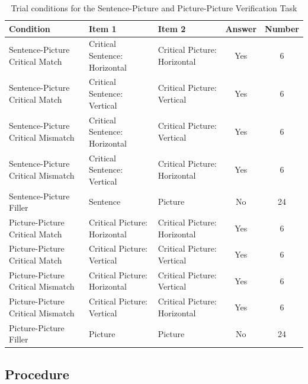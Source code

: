 \documentclass[
  man,mask,floatsintext]{apa7}
\begin{document}
\begin{table}[tbp]

\begin{center}
\begin{threeparttable}

\caption{\label{tab:stim-table}Trial conditions for the Sentence-Picture and Picture-Picture Verification Task}

\scriptsize{

\begin{tabular}{lllcc}
\toprule
Condition & Item 1 & Item 2 & Answer & Number\\
\midrule
Sentence-Picture
Critical
Match & Critical Sentence:
Horizontal & Critical Picture:
Horizontal & Yes & 6\\
Sentence-Picture
Critical
Match & Critical Sentence:
Vertical & Critical Picture:
Vertical & Yes & 6\\
Sentence-Picture
Critical
Mismatch & Critical Sentence:
Horizontal & Critical Picture:
Vertical & Yes & 6\\
Sentence-Picture
Critical
Mismatch & Critical Sentence:
Vertical & Critical Picture:
Horizontal & Yes & 6\\
Sentence-Picture
Filler & Sentence & Picture & No & 24\\
Picture-Picture
Critical
Match & Critical Picture:
Horizontal & Critical Picture:
Horizontal & Yes & 6\\
Picture-Picture
Critical
Match & Critical Picture:
Vertical & Critical Picture:
Vertical & Yes & 6\\
Picture-Picture
Critical
Mismatch & Critical Picture:
Horizontal & Critical Picture:
Vertical & Yes & 6\\
Picture-Picture
Critical
Mismatch & Critical Picture:
Vertical & Critical Picture:
Horizontal & Yes & 6\\
Picture-Picture
Filler & Picture & Picture & No & 24\\
\bottomrule
\end{tabular}

}

\end{threeparttable}
\end{center}

\end{table}

\hypertarget{procedure}{%
\subsection{Procedure}\label{procedure}}
\end{document}
